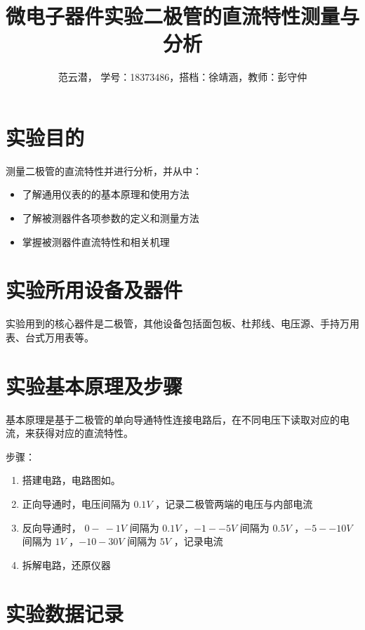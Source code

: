 \documentclass[lang=cn,11pt,a4paper,cite=authoryear]{elegantpaper}
\title{微电子器件实验\quad 二极管的直流特性测量与分析}
\author{范云潜， 学号：18373486，搭档：徐靖涵，教师：彭守仲}
\institute{微电子学院 184111 班}
\date{\zhdate{2020/10/19}}
\begin{document}
\maketitle


\section{实验目的}

测量二极管的直流特性并进行分析，并从中：

\begin{itemize}
    \item 了解通用仪表的的基本原理和使用方法
    \item 了解被测器件各项参数的定义和测量方法
    \item 掌握被测器件直流特性和相关机理
\end{itemize}

\section{实验所用设备及器件}

实验用到的核心器件是二极管，其他设备包括面包板、杜邦线、电压源、手持万用表、台式万用表等。

\section{实验基本原理及步骤}

基本原理是基于二极管的单向导通特性连接电路后，在不同电压下读取对应的电流，来获得对应的直流特性。

步骤：\begin{enumerate}
    \item 搭建电路，电路图如。
    \item 正向导通时，电压间隔为 \(0.1 V\) ，记录二极管两端的电压与内部电流
    \item 反向导通时， \(0 - \ -1 V\) 间隔为 \(0.1 V\) ，\(-1 - -5V\) 间隔为 \(0.5 V\) ，\(-5 - -10 V\) 间隔为 \(1 V\) ，\(-10 - 30 V\) 间隔为 \(5 V\) ，记录电流
    \item 拆解电路，还原仪器
\end{enumerate}




\section{实验数据记录}
\end{document}
